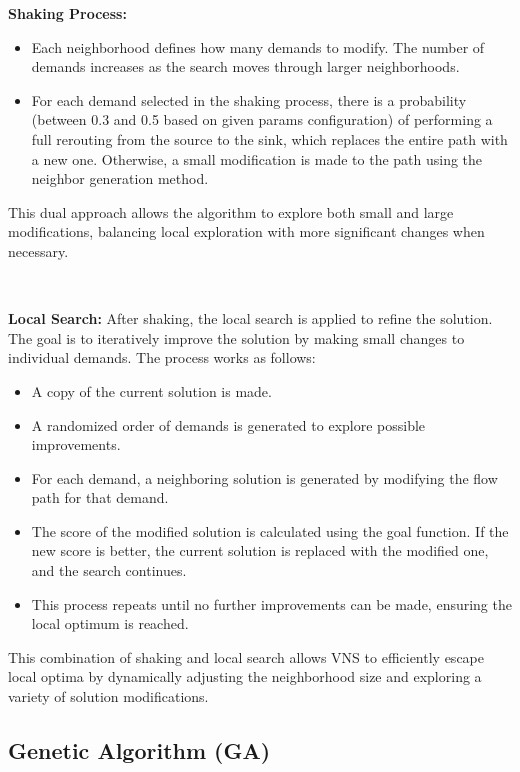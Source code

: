 \documentclass[a4paper,12pt]{article}
\begin{document}
\noindent \textbf{Shaking Process:}
\begin{itemize}
    \item Each neighborhood defines how many demands to modify. The number of demands increases as the search moves through larger neighborhoods.
    \item For each demand selected in the shaking process, there is a probability (between 0.3 and 0.5 based on given params configuration) of performing a full rerouting from the source to the sink, which replaces the entire path with a new one. Otherwise, a small modification is made to the path using the neighbor generation method.
\end{itemize}

\noindent This dual approach allows the algorithm to explore both small and large modifications, balancing local exploration with more significant changes when necessary.

\

\noindent \textbf{Local Search:}
After shaking, the local search is applied to refine the solution. The goal is to iteratively improve the solution by making small changes to individual demands. The process works as follows:

\begin{itemize}
    \item A copy of the current solution is made.
    \item A randomized order of demands is generated to explore possible improvements.
    \item For each demand, a neighboring solution is generated by modifying the flow path for that demand.
    \item The score of the modified solution is calculated using the goal function. If the new score is better, the current solution is replaced with the modified one, and the search continues.
    \item This process repeats until no further improvements can be made, ensuring the local optimum is reached.
\end{itemize}

\noindent This combination of shaking and local search allows VNS to efficiently escape local optima by dynamically adjusting the neighborhood size and exploring a variety of solution modifications.

\subsection{Genetic Algorithm (GA)}
\end{document}
